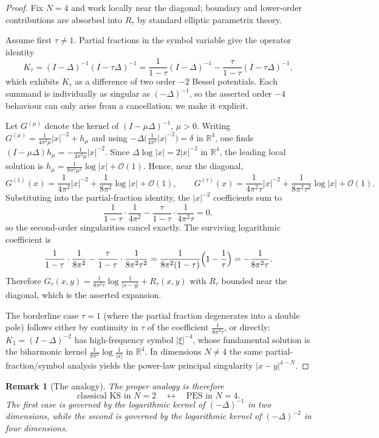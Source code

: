 \documentclass[pdflatex,sn-mathphys-num]{sn-jnl}%
\theoremstyle{thmstyleone}
\theoremstyle{thmstyletwo}
\newtheorem{remark}{Remark}
\theoremstyle{thmstylethree}
\begin{document}
\begin{proof}
Fix $N=4$ and work locally near the diagonal; boundary and lower-order
contributions are absorbed into $R_\tau$ by standard elliptic parametrix
theory.

Assume first $\tau\neq1$. Partial fractions in the symbol variable give the
operator identity
\[
   K_\tau=(I-\Delta)^{-1}(I-\tau\Delta)^{-1}
        =\frac{1}{1-\tau}(I-\Delta)^{-1}
         -\frac{\tau}{1-\tau}(I-\tau\Delta)^{-1},
\]
which exhibits $K_\tau$ as a difference of two order $-2$ Bessel
potentials. Each summand is individually as singular as $(-\Delta)^{-1}$, so
the asserted order $-4$ behaviour can only arise from a cancellation; we make
it explicit.

Let $G^{(\mu)}$ denote the kernel of $(I-\mu\Delta)^{-1}$, $\mu>0$. Writing
$G^{(\mu)}=\tfrac{1}{4\pi^2\mu}|x|^{-2}+h_\mu$ and using
$-\Delta\bigl(\tfrac{1}{4\pi^2}|x|^{-2}\bigr)=\delta$ in $\mathbb R^4$, one
finds $(I-\mu\Delta)h_\mu=-\tfrac{1}{4\pi^2\mu}|x|^{-2}$. Since
$\Delta\log|x|=2|x|^{-2}$ in $\mathbb R^4$, the leading local solution is
$h_\mu=\tfrac{1}{8\pi^2\mu^2}\log|x|+\mathcal O(1)$. Hence, near the diagonal,
\[
   G^{(1)}(x)=\frac{1}{4\pi^2}|x|^{-2}+\frac{1}{8\pi^2}\log|x|+\mathcal O(1),
   \qquad
   G^{(\tau)}(x)=\frac{1}{4\pi^2\tau}|x|^{-2}
                +\frac{1}{8\pi^2\tau^2}\log|x|+\mathcal O(1).
\]
Substituting into the partial-fraction identity, the $|x|^{-2}$ coefficients
sum to
\[
   \frac{1}{1-\tau}\cdot\frac{1}{4\pi^2}
   -\frac{\tau}{1-\tau}\cdot\frac{1}{4\pi^2\tau}=0,
\]
so the second-order singularities cancel exactly. The surviving logarithmic
coefficient is
\[
   \frac{1}{1-\tau}\cdot\frac{1}{8\pi^2}
   -\frac{\tau}{1-\tau}\cdot\frac{1}{8\pi^2\tau^2}
   =\frac{1}{8\pi^2(1-\tau)}\Bigl(1-\frac1\tau\Bigr)
   =-\frac{1}{8\pi^2\tau}.
\]
Therefore $G_\tau(x,y)=\tfrac{1}{8\pi^2\tau}\log\frac{1}{|x-y|}+R_\tau(x,y)$
with $R_\tau$ bounded near the diagonal, which is the asserted expansion.

The borderline case $\tau=1$ (where the partial fraction degenerates into a
double pole) follows either by continuity in $\tau$ of the coefficient
$\tfrac{1}{8\pi^2\tau}$, or directly: $K_1=(I-\Delta)^{-2}$ has high-frequency
symbol $|\xi|^{-4}$, whose fundamental solution is the biharmonic kernel
$\tfrac{1}{8\pi^2}\log\frac1{|x|}$ in $\mathbb R^4$. In dimensions $N\neq4$ the
same partial-fraction/symbol analysis yields the power-law principal
singularity $|x-y|^{4-N}$.
\end{proof}

\begin{remark}[The analogy]
\label{rem:correct-analogy}
The proper analogy is therefore
\[
        \text{classical KS in }N=2
        \quad\longleftrightarrow\quad
        \text{PES in }N=4.
\]
The first case is governed by the logarithmic kernel of \((-\Delta)^{-1}\) in
two dimensions, while the second is governed by the logarithmic kernel of
\((-\Delta)^{-2}\) in four dimensions.
\end{remark}
\end{document}
